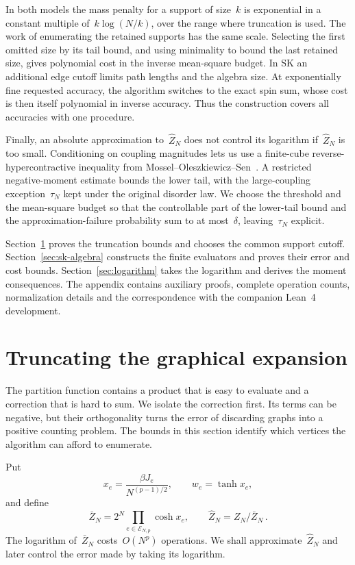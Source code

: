 \documentclass[10pt]{article}
\theoremstyle{plain}
\theoremstyle{definition}
\theoremstyle{remark}
\begin{document}
In both models the mass penalty for a support of size~$k$ is exponential in a constant multiple of~$k\log(N/k)$, over the range where truncation is used. The work of enumerating the retained supports has the same scale. Selecting the first omitted size by its tail bound, and using minimality to bound the last retained size, gives polynomial cost in the inverse mean-square budget. In SK an additional edge cutoff limits path lengths and the algebra size. At exponentially fine requested accuracy, the algorithm switches to the exact spin sum, whose cost is then itself polynomial in inverse accuracy. Thus the construction covers all accuracies with one procedure.

Finally, an absolute approximation to~$\hat Z_N$ does not control its logarithm if~$\hat Z_N$ is too small. Conditioning on coupling magnitudes lets us use a finite-cube reverse-hypercontractive inequality from Mossel--Oleszkiewicz--Sen~\cite{MOS13}. A restricted negative-moment estimate bounds the lower tail, with the large-coupling exception~$\tau_N$ kept under the original disorder law. We choose the threshold and the mean-square budget so that the controllable part of the lower-tail bound and the approximation-failure probability sum to at most~$\delta$, leaving~$\tau_N$ explicit.

Section~\ref{sec:preliminaries} proves the truncation bounds and chooses the common support cutoff. Section~\ref{sec:sk-algebra} constructs the finite evaluators and proves their error and cost bounds. Section~\ref{sec:logarithm} takes the logarithm and derives the moment consequences. The appendix contains auxiliary proofs, complete operation counts, normalization details and the correspondence with the companion Lean~4 development.

\section{Truncating the graphical expansion}\label{sec:preliminaries}
The partition function contains a product that is easy to evaluate and a correction that is hard to sum. We isolate the correction first. Its terms can be negative, but their orthogonality turns the error of discarding graphs into a positive counting problem. The bounds in this section identify which vertices the algorithm can afford to enumerate.

Put
\begin{equation}\label{eq:weights}
 x_e=\frac{\beta J_e}{N^{(p-1)/2}},\qquad w_e=\tanh x_e,
\end{equation}
and define
\begin{equation*}
 \bar Z_N=2^N\prod_{e\in\mathcal E_{N,p}}\cosh x_e,\qquad \hat Z_N=Z_N/\bar Z_N\,.
\end{equation*}
The logarithm of~$\bar Z_N$ costs~$O(N^p)$ operations. We shall approximate~$\hat Z_N$ and later control the error made by taking its logarithm.
\end{document}
